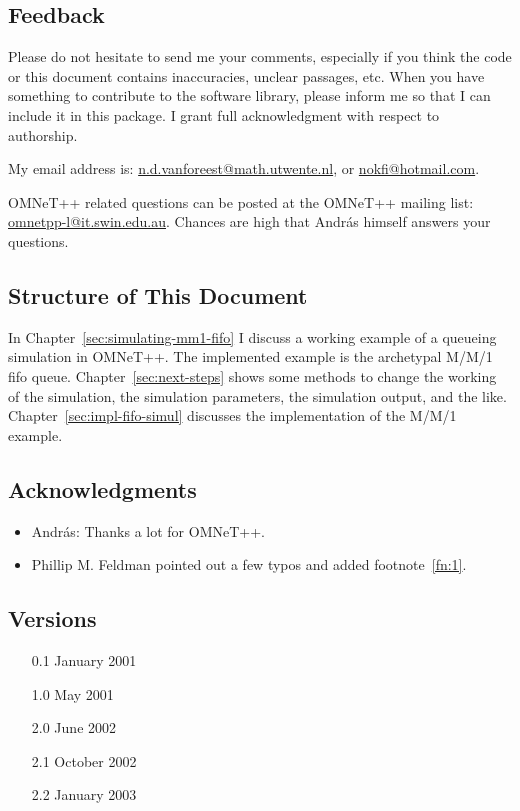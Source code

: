 \documentclass[a4paper]{article}
\begin{document}
\subsection{Feedback}
\label{sec:feedback}
Please do not hesitate to send me your comments, especially if you
think the code or this document contains inaccuracies, unclear
passages, etc. When you have something to contribute to the software
library, please inform me so that I can include it in this package. I
grant full acknowledgment with respect to authorship.

My email address is: \url{n.d.vanforeest@math.utwente.nl}, or
\url{nokfi@hotmail.com}.

OMNeT++ related questions can be posted at the OMNeT++ mailing list:
\url{omnetpp-l@it.swin.edu.au}. Chances are high that Andr{\'a}s himself
answers your questions.


\subsection{Structure of This Document}
\label{sec:struct-this-docum}
In Chapter~\ref{sec:simulating-mm1-fifo} I discuss a working example
of a queueing simulation in OMNeT++.  The implemented example is the
archetypal M/M/1 fifo queue.  Chapter~\ref{sec:next-steps} shows some
methods to change the working of the simulation, the simulation
parameters, the simulation output, and the like.
Chapter~\ref{sec:impl-fifo-simul} discusses the
implementation of the M/M/1 example.

\subsection{Acknowledgments}
\label{sec:acknowledgements}
\begin{itemize}
\item Andr{\'a}s: Thanks a lot for OMNeT++.
\item Phillip M. Feldman pointed out a few typos and added footnote~\ref{fn:1}.

\end{itemize}

\subsection{Versions}
\begin{enumerate}
\item[0.1] January 2001
\item[1.0] May 2001
\item[2.0] June 2002
\item[2.1] October 2002
\item[2.2] January 2003
\end{enumerate}
\end{document}
